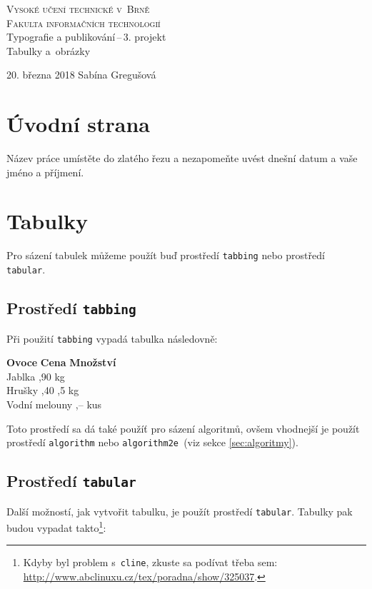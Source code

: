 \documentclass[11pt, a4paper]{article}
\begin{document}
\begin{titlepage}
\begin{center}
\Huge
\textsc{Vysoké učení technické v~Brně}\\
\huge
\textsc{Fakulta informačních technologií}\\
\LARGE Typografie a publikování\,--\,3. projekt\\
\Huge Tabulky a~obrázky
\end{center}
{\Large 20. března 2018 \hfill
Sabína Gregušová}
\end{titlepage}


\section{Úvodní strana}
Název práce umístěte do zlatého řezu a nezapomeňte uvést dnešní datum a vaše jméno a příjmení.

\section{Tabulky}
Pro sázení tabulek můžeme použít buď prostředí \texttt{tabbing} nebo prostředí \texttt{tabular}.

\subsection{Prostředí \texttt{tabbing}}
Při použití \texttt{tabbing} vypadá tabulka následovně:
\begin{tabbing}
\textbf{Ovoce} \qquad\qquad \= \textbf{Cena} \qquad \= \textbf{Množství}\\
Jablka ,90  kg\\
Hrušky ,40 ,5 kg\\
Vodní melouny ,--  kus
\end{tabbing}
\bigskip
Toto prostředí sa dá také použíť pro sázení algoritmů, ovšem vhodnejší je použít prostředí \texttt{algorithm} nebo \texttt{algorithm2e }(viz sekce \ref{sec:algoritmy}).

\subsection{Prostředí \texttt{tabular}}
Další možností, jak vytvořit tabulku, je použít prostředí \texttt{tabular}. Tabulky pak budou vypadat takto\footnote{Kdyby byl problem s~\texttt{cline}, zkuste sa podívat třeba sem: \url{http://www.abclinuxu.cz/tex/poradna/show/325037}.}:
\bigskip
\end{document}

